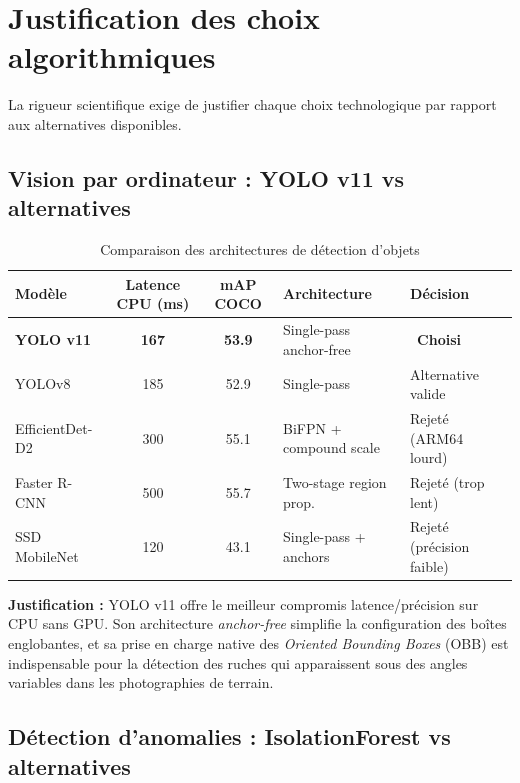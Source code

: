 \documentclass[12pt,a4paper,oneside]{report}
\newcommand{\yes}{\ding{52}}
\begin{document}
\section{Justification des choix algorithmiques}

La rigueur scientifique exige de justifier chaque choix technologique par rapport aux
alternatives disponibles.

\subsection{Vision par ordinateur : YOLO v11 vs alternatives}

\begin{table}[H]\centering
\caption{Comparaison des architectures de détection d'objets}
\label{tab:yolo_compare}
\small
\begin{tabular}{lccll}
\toprule
\textbf{Modèle}&\textbf{Latence CPU (ms)}&\textbf{mAP COCO}&\textbf{Architecture}&\textbf{Décision}\\
\midrule
\textbf{YOLO v11} & \textbf{167}  & \textbf{53.9} & Single-pass anchor-free & \yes~\textbf{Choisi}\\
YOLOv8            & 185           & 52.9          & Single-pass             & Alternative valide \\
EfficientDet-D2   & 300           & 55.1          & BiFPN + compound scale  & Rejeté (ARM64 lourd)\\
Faster R-CNN      & 500           & 55.7          & Two-stage region prop.  & Rejeté (trop lent)\\
SSD MobileNet     & 120           & 43.1          & Single-pass + anchors   & Rejeté (précision faible)\\
\bottomrule
\end{tabular}
\end{table}

\noindent\textbf{Justification :} YOLO v11 offre le meilleur compromis latence/précision
sur CPU sans GPU. Son architecture \textit{anchor-free} simplifie la configuration des
boîtes englobantes, et sa prise en charge native des \textit{Oriented Bounding Boxes}
(OBB) est indispensable pour la détection des ruches qui apparaissent sous des angles
variables dans les photographies de terrain.

\subsection{Détection d'anomalies : IsolationForest vs alternatives}
\end{document}
